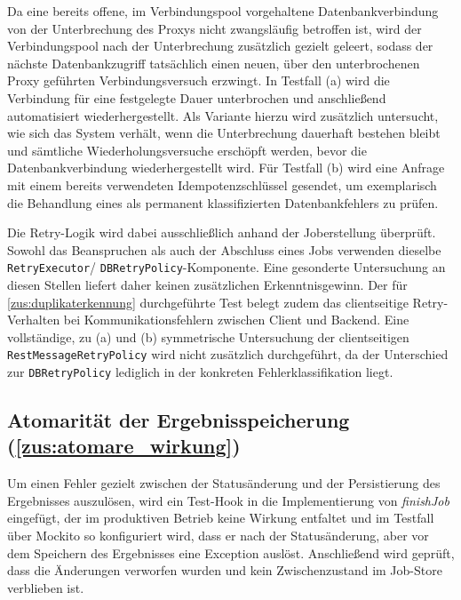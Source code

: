 Da eine bereits offene, im Verbindungspool vorgehaltene Datenbankverbindung von der Unterbrechung des Proxys nicht
zwangsläufig betroffen ist, wird der Verbindungspool nach der Unterbrechung zusätzlich gezielt geleert, sodass der nächste
Datenbankzugriff tatsächlich einen neuen, über den unterbrochenen Proxy geführten Verbindungsversuch erzwingt.
In Testfall (a) wird die Verbindung für eine festgelegte Dauer unterbrochen und anschließend automatisiert wiederhergestellt.
Als Variante hierzu wird zusätzlich untersucht, wie sich das System verhält, wenn die Unterbrechung dauerhaft bestehen
bleibt und sämtliche Wiederholungsversuche erschöpft werden, bevor die Datenbankverbindung wiederhergestellt wird.
Für Testfall (b) wird eine Anfrage mit einem bereits verwendeten Idempotenzschlüssel gesendet, um exemplarisch
die Behandlung eines als permanent klassifizierten Datenbankfehlers zu prüfen.

Die Retry-Logik wird dabei ausschließlich anhand der Joberstellung überprüft.
Sowohl das Beanspruchen als auch der Abschluss eines Jobs verwenden dieselbe \texttt{RetryExecutor}/ \texttt{DBRetryPolicy}-Komponente.
Eine gesonderte Untersuchung an diesen Stellen liefert daher keinen zusätzlichen Erkenntnisgewinn.
Der für \ref{zus:duplikaterkennung} durchgeführte Test belegt zudem das clientseitige Retry-Verhalten bei Kommunikationsfehlern zwischen Client und Backend.
Eine vollständige, zu (a) und (b) symmetrische Untersuchung der clientseitigen \texttt{RestMessageRetryPolicy} wird nicht zusätzlich durchgeführt,
da der Unterschied zur \texttt{DBRetryPolicy} lediglich in der konkreten Fehlerklassifikation liegt.

\subsection{Atomarität der Ergebnisspeicherung (\ref{zus:atomare_wirkung})}
\label{subsec:durchfuehrung_z4}
Um einen Fehler gezielt zwischen der Statusänderung und der Persistierung des Ergebnisses auszulösen, wird ein
Test-Hook in die Implementierung von \textit{finishJob} eingefügt, der im produktiven Betrieb keine Wirkung entfaltet und
im Testfall über Mockito so konfiguriert wird, dass er nach der Statusänderung, aber vor dem Speichern des Ergebnisses
eine Exception auslöst.
Anschließend wird geprüft, dass die Änderungen verworfen wurden und kein Zwischenzustand im Job-Store verblieben ist.

